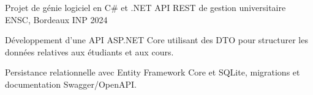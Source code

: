 
\begin{cventries}
  \cventry
    {Projet de génie logiciel en C\# et .NET}
    {API REST de gestion universitaire}
    {ENSC, Bordeaux INP}
    {2024}
    {
      \begin{cvitems}
        \item {Développement d’une API ASP.NET Core utilisant des DTO pour structurer les données relatives aux étudiants et aux cours.}
        \item {Persistance relationnelle avec Entity Framework Core et SQLite, migrations et documentation Swagger/OpenAPI.}
      \end{cvitems}
    }
\end{cventries}
